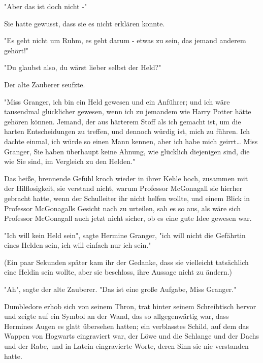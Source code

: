 {"Aber das ist doch nicht -"

Sie hatte gewusst, dass sie es nicht erklären konnte.

"Es geht nicht um Ruhm, es geht darum - etwas zu sein, das jemand anderem gehört!"

"Du glaubst also, du wärst lieber selbst der Held?"

Der alte Zauberer seufzte.

"Miss Granger, ich bin ein Held gewesen und ein Anführer; und ich wäre tausendmal glücklicher gewesen, wenn ich zu jemandem wie Harry Potter hätte gehören können. Jemand, der aus härterem Stoff als ich gemacht ist, um die harten Entscheidungen zu treffen, und dennoch würdig ist, mich zu führen. Ich dachte einmal, ich würde so einen Mann kennen, aber ich habe mich geirrt… Miss Granger, Sie haben überhaupt keine Ahnung, wie glücklich diejenigen sind, die wie Sie sind, im Vergleich zu den Helden."

Das heiße, brennende Gefühl kroch wieder in ihrer Kehle hoch, zusammen mit der Hilflosigkeit, sie verstand nicht, warum Professor McGonagall sie hierher gebracht hatte, wenn der Schulleiter ihr nicht helfen wollte, und einem Blick in Professor McGonagalls Gesicht nach zu urteilen, sah es so aus, als wäre sich Professor McGonagall auch jetzt nicht sicher, ob es eine gute Idee gewesen war.

"Ich will kein Held sein", sagte Hermine Granger, "ich will nicht die Gefährtin eines Helden sein, ich will einfach nur ich sein."

(Ein paar Sekunden später kam ihr der Gedanke, dass sie vielleicht tatsächlich eine Heldin sein wollte, aber sie beschloss, ihre Aussage nicht zu ändern.)

"Ah", sagte der alte Zauberer. "Das ist eine große Aufgabe, Miss Granger."

Dumbledore erhob sich von seinem Thron, trat hinter seinem Schreibtisch hervor und zeigte auf ein Symbol an der Wand, das so allgegenwärtig war, dass Hermines Augen es glatt übersehen hatten; ein verblasstes Schild, auf dem das Wappen von Hogwarts eingraviert war, der Löwe und die Schlange und der Dachs und der Rabe, und in Latein eingravierte Worte, deren Sinn sie nie verstanden hatte.

}
